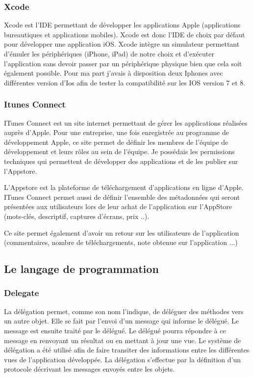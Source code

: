 \subsubsection{Xcode}
Xcode est l’IDE permettant de développer les applications Apple (applications bureautiques et applications mobiles). Xcode est donc l’IDE de choix par défaut pour développer une application iOS. Xcode intègre un simulateur permettant d’émuler les périphériques (iPhone, iPad) de notre choix et d’exécuter l’application sans devoir passer par un périphérique physique bien que cela soit également possible. Pour ma part j'avais à disposition deux Iphones avec différentes version d'Ios afin de tester la compatibilité sur les IOS version 7 et 8. 

\subsubsection{Itunes Connect}
ITunes Connect est un site internet permettant de gérer les applications réalisées auprès d’Apple. Pour une entreprise, une fois enregistrée au programme de développement Apple, ce site permet de définir les membres de l’équipe de développement et leurs rôles au sein de l’équipe. Je possédais les permissions techniques qui permettent de développer des applications et de les publier sur l’Appstore. 

L'Appstore est la plateforme de téléchargement d'applications en ligne d'Apple. ITunes Connect permet aussi de définir l’ensemble des métadonnées qui seront présentées aux utilisateurs lors de leur achat de l’application sur l’AppStore (mots-clés, descriptif, captures d’écrans, prix ..).

Ce site permet également d'avoir un retour sur les utilisateurs de l'application (commentaires, nombre de téléchargements, note obtenue sur l'application ...)


\subsection{Le langage de programmation}

\subsubsection{Delegate}

La délégation permet, comme son nom l'indique, de déléguer des méthodes vers un autre objet. Elle se fait par l'envoi d'un message qui informe le délégué. Le message est ensuite traité par le délégué. Le délégué pourra répondre à ce message en renvoyant un résultat ou en mettant à jour une vue. Le système de délégation a été utilisé afin de faire transiter des informations entre les différentes vues de l'application développée. La délégation s'effectue par la définition d'un protocole décrivant les messages envoyés entre les objets.

